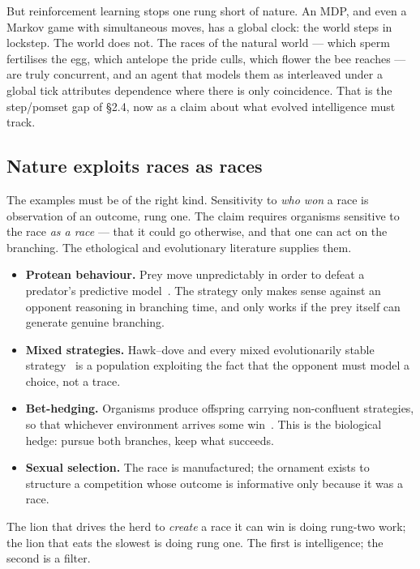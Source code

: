 \documentclass[11pt]{article}
\theoremstyle{plain}
\theoremstyle{definition}
\theoremstyle{remark}
\begin{document}
But reinforcement learning stops one rung short of nature. An MDP, and even a
Markov game with simultaneous moves, has a global clock: the world steps in
lockstep. The world does not. The races of the natural world --- which sperm
fertilises the egg, which antelope the pride culls, which flower the bee
reaches --- are truly concurrent, and an agent that models them as
interleaved under a global tick attributes dependence where there is only
coincidence. That is the step/pomset gap of \S2.4, now as a claim about what
evolved intelligence must track.

\subsection{Nature exploits races as races}

The examples must be of the right kind. Sensitivity to \emph{who won} a race
is observation of an outcome, rung one. The claim requires organisms sensitive
to the race \emph{as a race} --- that it could go otherwise, and that one can
act on the branching. The ethological and evolutionary literature supplies
them.

\begin{itemize}[leftmargin=2.2em,itemsep=0.25em]
\item \textbf{Protean behaviour.} Prey move unpredictably in order to defeat
a predator's predictive model~\cite{HumphriesDriver70}. The strategy only
makes sense against an opponent reasoning in branching time, and only works if
the prey itself can generate genuine branching.
\item \textbf{Mixed strategies.} Hawk--dove and every mixed evolutionarily
stable strategy~\cite{MaynardSmith82} is a population exploiting the fact that
the opponent must model a choice, not a trace.
\item \textbf{Bet-hedging.} Organisms produce offspring carrying non-confluent
strategies, so that whichever environment arrives some
win~\cite{SegerBrockmann87}. This is the biological hedge: pursue both
branches, keep what succeeds.
\item \textbf{Sexual selection.} The race is manufactured; the ornament exists
to structure a competition whose outcome is informative only because it was a
race.
\end{itemize}

The lion that drives the herd to \emph{create} a race it can win is doing
rung-two work; the lion that eats the slowest is doing rung one. The first is
intelligence; the second is a filter.
\end{document}
